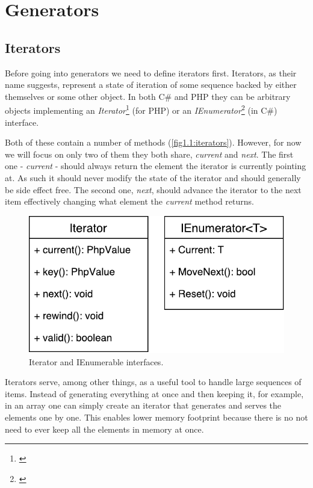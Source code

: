 \chapter{Generators}
\section{Iterators}
Before going into generators we need to define iterators first. Iterators, as their name suggests, represent a state of iteration of some sequence backed by either themselves or some other object. In both C\# and PHP they can be arbitrary objects implementing an \emph{Iterator}\footnote{\citep{IterPHP}} (for PHP) or an \emph{IEnumerator}\footnote{\citep{IterNet}} (in C\#) interface. 

Both of these contain a number of methods  (\autoref{fig1.1:iterators}). However, for now we will focus on only two of them they both share, \emph{current} and \emph{next}. The first one - \emph{current} - should always return the element the iterator is currently pointing at. As such it should never modify the state of the iterator and should generally be side effect free. The second one, \emph{next}, should advance the iterator to the next item effectively changing what element the \emph{current} method returns.

\begin{figure}[h]	
	\centering	
	\includegraphics[scale=0.75]{../img/1_1_iterators}	
	\caption{Iterator and IEnumerable interfaces.}
	\label{fig1.1:iterators}
\end{figure}

Iterators serve, among other things, as a useful tool to handle large sequences of items. Instead of generating everything at once and then keeping it, for example, in an array one can simply create an iterator that generates and serves the elements one by one. This enables lower memory footprint because there is no not need to ever keep all the elements in memory at once. 

